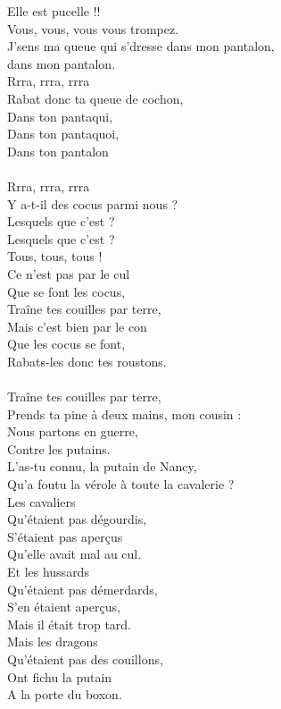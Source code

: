 \breakpage
Elle est pucelle !!
\\Vous, vous, vous vous trompez.
\\J'sens ma queue qui s'dresse dans mon pantalon,
\\dans mon pantalon.
\\Rrra, rrra, rrra 
\\Rabat donc ta queue de cochon,
\\Dans ton pantaqui, 
\\Dans ton pantaquoi, 
\\Dans ton pantalon 
\\\\Rrra, rrra, rrra 
\\Y a-t-il des cocus parmi nous ?
\\Lesquels que c'est ? 
\\Lesquels que c'est ?
\\Tous, tous, tous !
\\Ce n'est pas par le cul
\\Que se font les cocus,
\\Traîne tes couilles par terre,
\\Mais c'est bien par le con
\\Que les cocus se font,
\\Rabats-les donc tes roustons.
\\\\Traîne tes couilles par terre,
\\Prends ta pine à deux mains, mon cousin :
\\Nous partons en guerre,
\\Contre les putains.
\\L'as-tu connu, la putain de Nancy,
\\Qu'a foutu la vérole à toute la cavalerie ?
\\Les cavaliers 
\\Qu'étaient pas dégourdis,
\\S'étaient pas aperçus
\\Qu'elle avait mal au cul.
\\Et les hussards 
\\Qu'étaient pas démerdards,
\\S'en étaient aperçus, 
\\Mais il était trop tard.
\\Mais les dragons 
\\Qu'étaient pas des couillons,
\\Ont fichu la putain 
\\A la porte du boxon.
